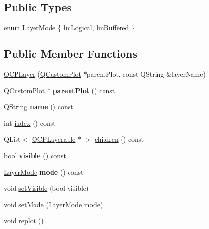 \subsection*{Public Types}
\begin{DoxyCompactItemize}
\item 
enum \hyperlink{classQCPLayer_a67dcfc1590be2a1f2227c5a39bb59c7c}{Layer\+Mode} \{ \hyperlink{classQCPLayer_a67dcfc1590be2a1f2227c5a39bb59c7ca02eb5e9a4cb7f1baf1e2b6b99e3b87ce}{lm\+Logical}, 
\hyperlink{classQCPLayer_a67dcfc1590be2a1f2227c5a39bb59c7cab581b9fab3007c4c65f057f4185d7538}{lm\+Buffered}
 \}
\end{DoxyCompactItemize}
\subsection*{Public Member Functions}
\begin{DoxyCompactItemize}
\item 
\hyperlink{classQCPLayer_a5d0657fc86d624e5efbe930ef21af718}{Q\+C\+P\+Layer} (\hyperlink{classQCustomPlot}{Q\+Custom\+Plot} $\ast$parent\+Plot, const Q\+String \&layer\+Name)
\item 
\hyperlink{classQCustomPlot}{Q\+Custom\+Plot} $\ast$ {\bfseries parent\+Plot} () const \hypertarget{classQCPLayer_a3958c9a938c2d05a7378c41484acee08}{}\label{classQCPLayer_a3958c9a938c2d05a7378c41484acee08}

\item 
Q\+String {\bfseries name} () const \hypertarget{classQCPLayer_a96ebd1e436f3813938cb9cd4a59a60be}{}\label{classQCPLayer_a96ebd1e436f3813938cb9cd4a59a60be}

\item 
int \hyperlink{classQCPLayer_ad5d7010829a6b99f326b07d7e37c8c99}{index} () const 
\item 
Q\+List$<$ \hyperlink{classQCPLayerable}{Q\+C\+P\+Layerable} $\ast$ $>$ \hyperlink{classQCPLayer_a94c2f0100e48cefad2de8fe0fbb03c27}{children} () const 
\item 
bool {\bfseries visible} () const \hypertarget{classQCPLayer_a9efca636e4dcad721999a6282f296016}{}\label{classQCPLayer_a9efca636e4dcad721999a6282f296016}

\item 
\hyperlink{classQCPLayer_a67dcfc1590be2a1f2227c5a39bb59c7c}{Layer\+Mode} {\bfseries mode} () const \hypertarget{classQCPLayer_ae93755983003f89e5331bc91598a772e}{}\label{classQCPLayer_ae93755983003f89e5331bc91598a772e}

\item 
void \hyperlink{classQCPLayer_ac07671f74edf6884b51a82afb2c19516}{set\+Visible} (bool visible)
\item 
void \hyperlink{classQCPLayer_a938d57b04f4e4c23cedf1711f983919b}{set\+Mode} (\hyperlink{classQCPLayer_a67dcfc1590be2a1f2227c5a39bb59c7c}{Layer\+Mode} mode)
\item 
void \hyperlink{classQCPLayer_adefd53b6db02f470151c416f42e37180}{replot} ()
\end{DoxyCompactItemize}
